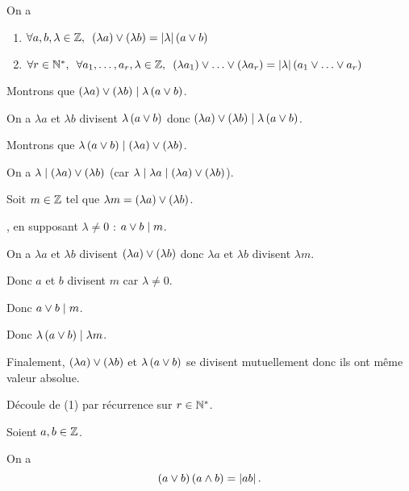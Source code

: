 \begin{prop}
On a

\begin{enumerate}
\item \(\quantifs{\forall a,b,\lambda\in\Z}\paren{\lambda a}\ou\paren{\lambda b}=\abs{\lambda}\paren{a\ou b}\) \\

\item \(\quantifs{\forall r\in\Ns;\forall a_1,\dots,a_r,\lambda\in\Z}\paren{\lambda a_1}\ou\dots\ou\paren{\lambda a_r}=\abs{\lambda}\paren{a_1\ou\dots\ou a_r}\)
\end{enumerate}
\end{prop}

\begin{dem}[1]
Montrons que \(\left(\lambda a\right)\lor\left(\lambda b\right)\mid\lambda\left(a\lor b\right)\).

On a \(\lambda a\) et \(\lambda b\) divisent \(\lambda\left(a\lor b\right)\) donc \(\left(\lambda a\right)\lor\left(\lambda b\right)\mid\lambda\left(a\lor b\right)\).

Montrons que \(\lambda\left(a\lor b\right)\mid\left(\lambda a\right)\lor\left(\lambda b\right)\).

On a \(\lambda\mid\left(\lambda a\right)\lor\left(\lambda b\right)\) (car \(\lambda\mid\lambda a\mid\left(\lambda a\right)\lor\left(\lambda b\right)\)).

Soit \(m\in\mathbb{Z}\) tel que \(\lambda m=\left(\lambda a\right)\lor\left(\lambda b\right)\).

\Cad, en supposant \(\lambda\not=0\) : \(a\lor b\mid m\).

On a \(\lambda a\) et \(\lambda b\) divisent \(\left(\lambda a\right)\lor\left(\lambda b\right)\) donc \(\lambda a\) et \(\lambda b\) divisent \(\lambda m\).

Donc \(a\) et \(b\) divisent \(m\) car \(\lambda\not=0\).

Donc \(a\lor b\mid m\).

Donc \(\lambda\left(a\lor b\right)\mid\lambda m\).

Finalement, \(\left(\lambda a\right)\lor\left(\lambda b\right)\) et \(\lambda\left(a\lor b\right)\) se divisent mutuellement donc ils ont même valeur absolue.
\end{dem}

\begin{dem}[2]
Découle de (1) par récurrence sur \(r\in\mathbb{N}^*\).
\end{dem}

\begin{prop}
Soient \(a,b\in\mathbb{Z}\).

On a \[\left(a\lor b\right)\left(a\land b\right)=\left\lvert ab\right\rvert.\]
\end{prop}

